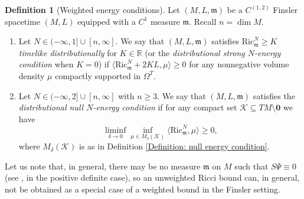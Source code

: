 \documentclass[a4paper,11pt]{article}
\numberwithin{equation}{section}
\theoremstyle{definition}
\newtheorem{Definition}{Definition}[section]
\theoremstyle{plain}
\newcommand{\R}{\mathbb R}
\newcommand{\Ric}{\mathrm{Ric}}
\newcommand{\m}{\mathfrak m}
\begin{document}
\begin{Definition}[Weighted energy conditions]
\label{Definition: Weighted energy conditions}
    Let $(M,L,\mathfrak m)$ be a $C^{(1,2)}$ Finsler spacetime $(M,L)$ equipped with a $C^1$ measure $\mathfrak m$. 
    Recall $n=\dim M$.
\begin{enumerate}
\item[(1)] 
    Let $N \in (-\infty,1] \cup [n,\infty]$. We say that $(M,L,\mathfrak m)$ satisfies $\Ric^N_{\mathfrak{m}} \geq K$ \emph{timelike distributionally} for $K \in \R$ (or the \emph{distributional strong $N$-energy condition} when $K=0$) if $\langle \Ric^N_{\mathfrak m} + 2 KL, \mu \rangle \geq 0$ for any nonnegative volume density $\mu$ compactly supported in $\Omega^T$. 
\item[(2)]
    Let $N \in (-\infty,2] \cup [n,\infty]$ with $n \ge 3$. 
    We say that $(M,L,\mathfrak m)$ satisfies the \emph{distributional null $N$-energy condition} if for any compact set $\mathcal K \subseteq TM \setminus \mathbf 0$ we have
    \begin{equation*}
        \liminf_{\delta \to 0} \inf_{\mu \in M_\delta(\mathcal K)} \langle \Ric^N_{\mathfrak m},\mu \rangle \geq 0,
    \end{equation*}
    where $M_\delta(\mathcal{K})$ is as in Definition \ref{Definition: null energy condition}.
\end{enumerate}
\end{Definition}

Let us note that, in general, there may be no measure $\m$ on $M$ such that $S\Psi \equiv 0$ (see \cite{OhtaScurvature}, \cite[\S 10.3.2]{Ohta2021} in the positive definite case), so an unweighted Ricci bound can, in general, not be obtained as a special case of a weighted bound in the Finsler setting.
\end{document}
